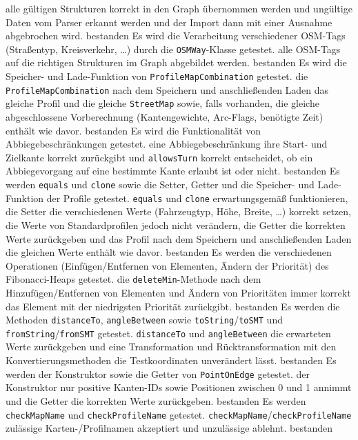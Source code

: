 \documentclass[a4paper, 11pt]{article}
\newcommand{\code}[1]{\texttt{#1}}
\begin{document}
\begin{itemize}
     {alle gültigen Strukturen korrekt in den Graph übernommen werden und ungültige Daten vom Parser erkannt werden und der Import dann mit einer Ausnahme abgebrochen wird.}
     {bestanden}
     {Es wird die Verarbeitung verschiedener OSM-Tags (Straßentyp, Kreisverkehr, \dots) durch die \code{OSMWay}-Klasse getestet.}
     {alle OSM-Tags auf die richtigen Strukturen im Graph abgebildet werden.}
     {bestanden}
     {Es wird die Speicher- und Lade-Funktion von \code{ProfileMapCombination} getestet.}
     {die \code{ProfileMapCombination} nach dem Speichern und anschließenden Laden das gleiche Profil und die gleiche \code{StreetMap} sowie, falls vorhanden, die gleiche abgeschlossene Vorberechnung (Kantengewichte, Arc-Flags, benötigte Zeit) enthält wie davor.}
     {bestanden}
     {Es wird die Funktionalität von Abbiegebeschränkungen getestet.}
     {eine Abbiegebeschränkung ihre Start- und Zielkante korrekt zurückgibt und \code{allowsTurn} korrekt entscheidet, ob ein Abbiegevorgang auf eine bestimmte Kante erlaubt ist oder nicht.}
     {bestanden}
     {Es werden \code{equals} und \code{clone} sowie die Setter, Getter und die Speicher- und Lade-Funktion der Profile getestet.}
     {\code{equals} und \code{clone} erwartungsgemäß funktionieren, die Setter die verschiedenen Werte (Fahrzeugtyp, Höhe, Breite, \dots) korrekt setzen, die Werte von Standardprofilen jedoch nicht verändern, die Getter die korrekten Werte zurückgeben und das Profil nach dem Speichern und anschließenden Laden die gleichen Werte enthält wie davor.}
     {bestanden}
     {Es werden die verschiedenen Operationen (Einfügen/Entfernen von Elementen, Ändern der Priorität) des Fibonacci-Heaps getestet.}
     {die \code{deleteMin}-Methode nach dem Hinzufügen/Entfernen von Elementen und Ändern von Prioritäten immer korrekt das Element mit der niedrigsten Priorität zurückgibt.}
     {bestanden}
     {Es werden die Methoden \code{distanceTo}, \code{angleBetween} sowie \code{toString}/\code{toSMT} und \code{fromString}/\code{fromSMT} getestet.}
     {\code{distanceTo} und \code{angleBetween} die erwarteten Werte zurückgeben und eine Transformation und Rücktransformation mit den Konvertierungsmethoden die Testkoordinaten unverändert lässt.}
     {bestanden}
     {Es werden der Konstruktor sowie die Getter von \code{PointOnEdge} getestet.}
     {der Konstruktor nur positive Kanten-IDs sowie Positionen zwischen 0 und 1 annimmt und die Getter die korrekten Werte zurückgeben.}
     {bestanden}
     {Es werden \code{checkMapName} und \code{checkProfileName} getestet.}
     {\code{checkMapName}/\code{checkProfileName} zulässige \mbox{Karten-/}\hspace{0pt}Profilnamen akzeptiert und unzulässige ablehnt.}
     {bestanden}
\end{itemize}
\end{document}
